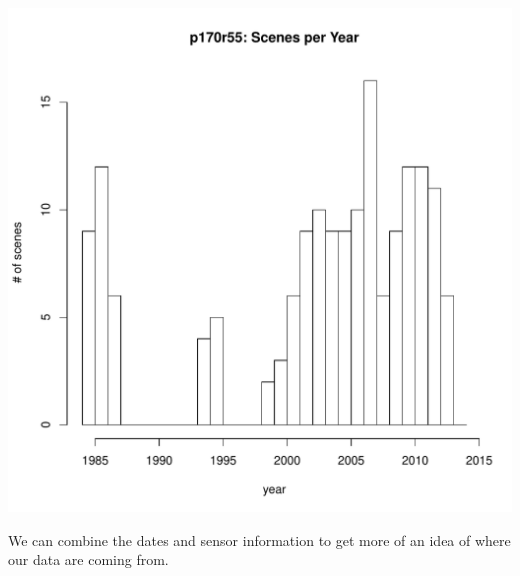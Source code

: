\documentclass{article}\usepackage[]{graphicx}\usepackage[]{color}
\makeatletter
\def\maxwidth{ %
  \ifdim\Gin@nat@width>\linewidth
    \linewidth
  \else
    \Gin@nat@width
  \fi
}
\newenvironment{knitrout}{}{} %
\makeatother
\begin{document}
\begin{knitrout}
\includegraphics[width=\maxwidth]{figure/getSceneinfo-tura} 

\end{knitrout}


We can combine the dates and sensor information to get more of an idea of where our data are coming from.
\end{document}
